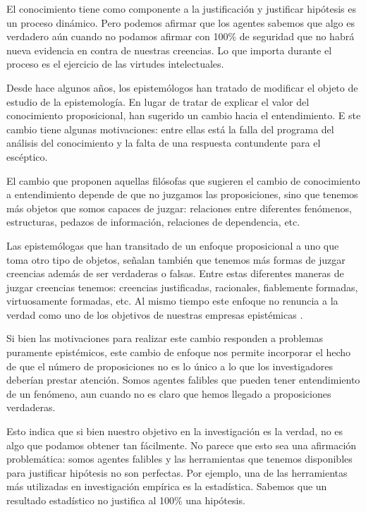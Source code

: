 El conocimiento tiene como componente a la justificación y justificar hipótesis es un proceso dinámico. 
Pero podemos afirmar que los agentes sabemos que algo es verdadero aún cuando no podamos afirmar con 100\% de seguridad que no habrá nueva evidencia en contra de nuestras creencias.
Lo que importa durante el proceso es el ejercicio de las virtudes intelectuales.

Desde hace algunos años, los epistemólogos han tratado de modificar el objeto de estudio de la epistemología.
En lugar de tratar de explicar el valor del conocimiento proposicional, han sugerido un cambio hacia el entendimiento. E
ste cambio tiene algunas motivaciones: entre ellas está la falla del programa del análisis del conocimiento y la falta de una respuesta contundente para el escéptico. 

El cambio que proponen aquellas filósofas que sugieren el cambio de conocimiento a entendimiento depende de que no juzgamos las proposiciones, sino que tenemos más objetos que somos capaces de juzgar: relaciones entre diferentes fenómenos, estructuras, pedazos de información, relaciones de dependencia, etc.

Las epistemólogas que han transitado de un enfoque proposicional a uno que toma otro tipo de objetos, señalan también que tenemos más formas de juzgar creencias además de ser verdaderas o falsas. 
Entre estas diferentes maneras de juzgar creencias tenemos: creencias justificadas, racionales, fiablemente formadas, virtuosamente formadas, etc. 
Al mismo tiempo este enfoque no renuncia a la verdad como uno de los objetivos de nuestras empresas epistémicas \parencite{grimm2012}.

Si bien las motivaciones para realizar este cambio responden a problemas puramente epistémicos, este cambio de enfoque nos permite incorporar el hecho de que el número de proposiciones no es lo único a lo que los investigadores deberían prestar atención.
Somos agentes falibles que pueden tener entendimiento de un fenómeno, aun cuando no es claro que hemos llegado a proposiciones verdaderas.

Esto indica que si bien nuestro objetivo en la investigación es la verdad, no es algo que podamos obtener tan fácilmente. 
No parece que esto sea una afirmación problemática: somos agentes falibles y las herramientas que tenemos disponibles para justificar hipótesis no son perfectas. 
Por ejemplo, una de las herramientas más utilizadas en investigación empírica es la estadística.
Sabemos que un resultado estadístico no justifica al 100\% una hipótesis. 

